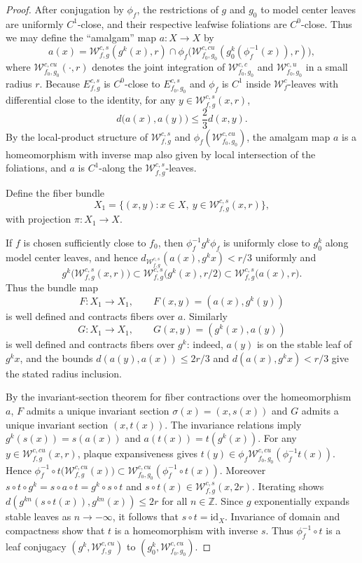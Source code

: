 \documentclass[11pt]{amsart}
\numberwithin{equation}{section}
\newcommand{\W}{\mathcal{W}}
\theoremstyle{plain}
\begin{document}
\begin{proof}
 After conjugation by $\phi_f$, the  restrictions of $g$ and $g_0$ to
model center leaves are uniformly $C^1$-close, and  their respective
leafwise foliations are $C^0$-close.  Thus we
may define the ``amalgam'' map $a:X\to X$ by
 \[
a(x)=\mathcal W^{c,s}_{f,g}(g^k(x),r)\cap
\phi_f\!\big(\mathcal W^{c,cu}_{f_0,g_0}(g_0^k(\phi_f^{-1}(x)),r)\big),
\]
where $\mathcal W^{c,cu}_{f_0,g_0}(\cdot,r)$ denotes the joint
integration of $\mathcal W^{c,c}_{f_0,g_0}$ and $\mathcal W^{c,u}_{f_0,g_0}$
in a small radius $r$. Because $E^{c,s}_{f,g}$ is $C^0$-close to
$E^{c,s}_{f_0,g_0}$ and  $\phi_f$ is $C^1$ inside $\W^c_f$-leaves with differential close to the
identity, for any
$y\in\mathcal W^{c,s}_{f,g}(x,r)$,
\[
d\big(a(x),a(y)\big)\le \frac{2}{3}d(x,y).
\]
By the local-product structure of $\W^{c,s}_{f,g}$ and $\phi_f(\W^{c,cu}_{f_0,g_0})$, the amalgam map $a$ is a homeomorphism with inverse map also given by local intersection of the foliations, and $a$ is $C^1$-along the $\W^{c,s}_{f,g}$-leaves.

Define the fiber bundle
\[
X_1=\{(x,y):x\in X,\ y\in\mathcal W^{c,s}_{f,g}(x,r)\},
\]
with projection $\pi:X_1\to X$.

If $f$ is chosen
sufficiently close to $f_0$, then  $\phi_f^{-1}g^k\phi_f$ is  uniformly close to  $g_0^k$ along
model center leaves, and hence $d_{\mathcal W^{c,s}_{f,g}}
(a(x),g^kx)<r/3$ uniformly and
\[
g^k\big(\mathcal W^{c,s}_{f,g}(x,r)\big)\subset
\mathcal W^{c,s}_{f,g}\big(g^k(x),r/2\big)\subset
\mathcal W^{c,s}_{f,g}\big(a(x),r\big).
\]
Thus the bundle map
\[
F:X_1\to X_1,\qquad F(x,y)=(a(x),g^k(y))
\]
is well defined and contracts fibers over $a$. Similarly
\[
G:X_1\to X_1,\qquad G(x,y)=(g^k(x),a(y))
\]
is well defined and contracts fibers over $g^k$: indeed,
$a(y)$ is on the stable leaf of $g^kx$, and the bounds
$d(a(y),a(x))\le2r/3$ and $d(a(x),g^kx)<r/3$ give the stated radius
inclusion. 

By the invariant-section theorem for fiber contractions over
the homeomorphism $a$, $F$ admits a unique invariant
section $\sigma(x)=(x,s(x))$ and $G$ admits a unique invariant section
$(x,t(x))$. The invariance relations imply
$g^k(s(x))=s(a(x))$ and $a(t(x))=t(g^k(x))$. For any
$y\in\mathcal W^{c,cu}_{f,g}(x,r)$, plaque expansiveness gives
$t(y)\in\phi_f\mathcal W^{c,cu}_{f_0,g_0}(\phi_f^{-1} t(x))$.
Hence  $\phi_f^{-1}\circ t\big(\mathcal W^{c,cu}_{f,g}(x)\big)\subset
\mathcal W^{c,cu}_{f_0,g_0}(\phi_f ^{-1} \circ t(x))$. Moreover
$s\circ t\circ g^k=s\circ a\circ t=g^k\circ s\circ t$ and
$s\circ t(x)\in\mathcal W^{c,s}_{f,g}(x,2r)$. Iterating shows
$d(g^{kn}(s\circ t(x)),g^{kn}(x))\le 2r$ for all $n\in\mathbb Z$. Since
$g$ exponentially expands stable leaves as $n\to-\infty$, it follows
that $s\circ t=\mathrm{id}_X$.  Invariance of domain and compactness
show that  $t$ is a  homeomorphism with  inverse $s$. Thus
 $\phi_f^{-1}\circ t$ is a leaf conjugacy
$(g^k,\mathcal W^{c,cu}_{f,g})$ to $(g_0^k,\mathcal W^{c,cu}_{f_0,g_0})$.


\end{proof}
\end{document}
